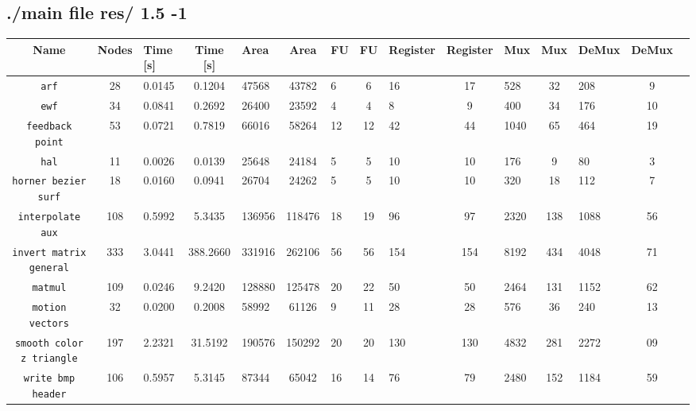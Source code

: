 \documentclass[a4paper, 11pt, oneside]{article}
\begin{document}
\begin{landscape}
\subsection{./main file res/ 1.5 -1}
\begin{table}[!h]
  \begin{center}
  \begin{tabular}{|c|c V{3} c|g|c|g|c|g|c|g|c|g|c|g|}
    \hline
    \textbf{Name} & \textbf{Nodes} & \textbf{Time [s]} & \textbf{Time [s]} & \textbf{Area} & \textbf{Area} & \textbf{FU} & \textbf{FU} & \textbf{Register} & \textbf{Register} & \textbf{Mux} & \textbf{Mux}
    & \textbf{DeMux} & \textbf{DeMux}\\
    \hline
    \texttt{arf}										  &  28 & 0.0145 &   0.1204 &  47568 &   43782 &  6 &  6 &  16 &  17 &  528 &  32 &  208 &   9 \\ \hline
    \texttt{ewf}										  &  34 & 0.0841 &   0.2692 &  26400 &   23592 &  4 &  4 &   8 &   9 &  400 &  34 &  176 &  10 \\ \hline
    \texttt{feedback point}					  &  53 & 0.0721 &   0.7819 &  66016 &   58264 & 12 & 12 &  42 &  44 & 1040 &  65 &  464 &  19 \\ \hline
    \texttt{hal}										  &  11 & 0.0026 &   0.0139 &  25648 &   24184 &  5 &  5 &  10 &  10 &  176 &   9 &   80 &   3 \\ \hline
    \texttt{horner bezier surf}			  &  18 & 0.0160 &   0.0941 &  26704 &   24262 &  5 &  5 &  10 &  10 &  320 &  18 &  112 &   7 \\ \hline
    \texttt{interpolate aux}				  & 108 & 0.5992 &   5.3435 & 136956 &  118476 & 18 & 19 &  96 &  97 & 2320 & 138 & 1088 &  56 \\ \hline
    \texttt{invert matrix general}	  & 333 & 3.0441 & 388.2660 & 331916 &  262106 & 56 & 56 & 154 & 154 & 8192 & 434 & 4048 &  71 \\ \hline
    \texttt{matmul}									  & 109 & 0.0246 &   9.2420 & 128880 &  125478 & 20 & 22 &  50 &  50 & 2464 & 131 & 1152 &  62 \\ \hline
    \texttt{motion vectors}					  &  32 & 0.0200 &   0.2008 &  58992 &   61126 &  9 & 11 &  28 &  28 &  576 &  36 &  240 &  13 \\ \hline
    \texttt{smooth color z triangle}	& 197 & 2.2321 &  31.5192 & 190576 &  150292 & 20 & 20 & 130 & 130 & 4832 & 281 & 2272 &  09 \\ \hline
    \texttt{write bmp header}				  & 106 & 0.5957 &   5.3145 &  87344 &   65042 & 16 & 14 &  76 &  79 & 2480 & 152 & 1184 &  59 \\ \hline
  \end{tabular}
  \end{center}
\end{table}


\end{landscape}
\end{document}
